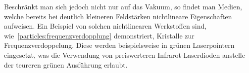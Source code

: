 Beschränkt man sich jedoch nicht nur auf das Vakuum, so findet man Medien, welche bereits bei deutlich kleineren Feldstärken nichtlineare Eigenschaften aufweisen.
Ein Beispiel von solchen nichtlinearen Werkstoffen sind, wie~\ref{particles:frequenzverdopplung} demonstriert, Kristalle zur Frequenzverdoppelung.
Diese werden beispielsweise in grünen Laserpointern eingesetzt, was die Verwendung von preiswerteren Infrarot-Laserdioden anstelle der teureren grünen Ausführung erlaubt.
